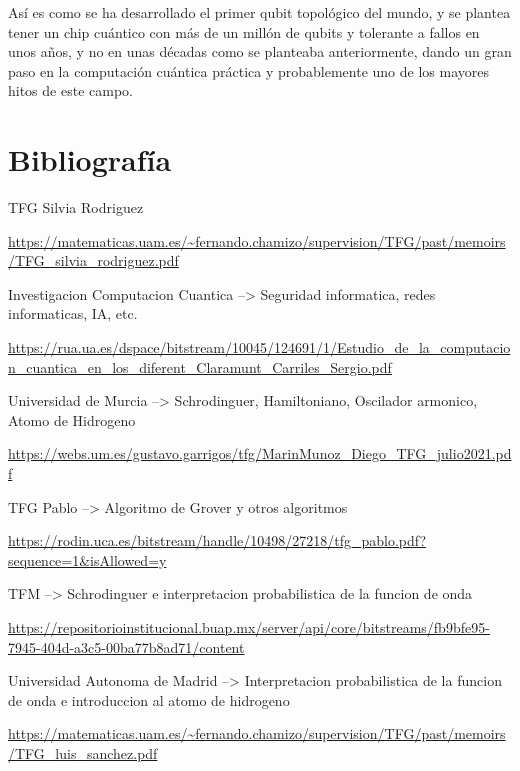 \documentclass{article}
\numberwithin{equation}{section} %
\begin{document}
    Así es como se ha desarrollado el primer qubit topológico del mundo, y se plantea tener un chip cuántico con más de un millón de qubits y tolerante a fallos en unos años, y no en unas décadas como se planteaba anteriormente, dando un gran paso en la computación cuántica práctica y probablemente uno de los mayores hitos de este campo.

    \newpage
    \thispagestyle{empty}
    \mbox{}
    \newpage

    \section{Bibliografía}

        \vspace{5mm}

        TFG Silvia Rodriguez\par
        \url{https://matematicas.uam.es/~fernando.chamizo/supervision/TFG/past/memoirs/TFG\_silvia\_rodriguez.pdf}
        \vspace{2mm}

        Investigacion Computacion Cuantica --> Seguridad informatica, redes informaticas, IA, etc.\par
        \url{https://rua.ua.es/dspace/bitstream/10045/124691/1/Estudio\_de\_la\_computacion\_cuantica\_en\_los\_diferent\_Claramunt\_Carriles\_Sergio.pdf}
        \vspace{2mm}

        Universidad de Murcia --> Schrodinguer, Hamiltoniano, Oscilador armonico, Atomo de Hidrogeno\par
        \url{https://webs.um.es/gustavo.garrigos/tfg/MarinMunoz\_Diego\_TFG\_julio2021.pdf}
        \vspace{2mm}

        TFG Pablo --> Algoritmo de Grover y otros algoritmos\par
        \url{https://rodin.uca.es/bitstream/handle/10498/27218/tfg\_pablo.pdf?sequence=1\&isAllowed=y}
        \vspace{2mm}

        TFM --> Schrodinguer e interpretacion probabilistica de la funcion de onda\par
        \url{https://repositorioinstitucional.buap.mx/server/api/core/bitstreams/fb9bfe95-7945-404d-a3c5-00ba77b8ad71/content}
        \vspace{2mm}

        Universidad Autonoma de Madrid --> Interpretacion probabilistica de la funcion de onda e introduccion al atomo de hidrogeno\par
        \url{https://matematicas.uam.es/~fernando.chamizo/supervision/TFG/past/memoirs/TFG\_luis\_sanchez.pdf}
        \vspace{2mm}
\end{document}
